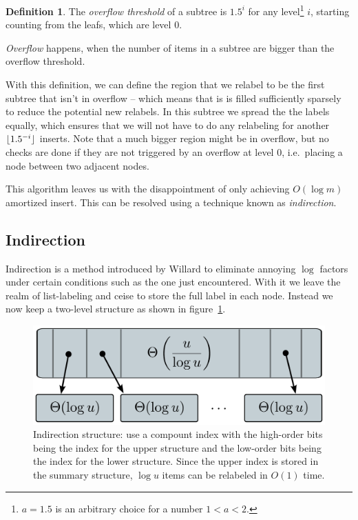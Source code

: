 \documentclass[11pt,a4paper,twoside,openright]{Thesis}
\DeclarePairedDelimiter\floor{\lfloor}{\rfloor}
\theoremstyle{definition}
\newtheorem*{defn}{Definition}
\newcommand{\Figref}[1]{figure~\ref{fig:#1}}
\newcommand{\figlabel}[1]{\label{fig:#1}}
\begin{document}
\begin{defn}
  The \emph{overflow threshold} of a subtree is $1.5^i$ for any 
  level\footnote{$a=1.5$ is an arbitrary choice for a number $1 < a < 2$.} $i$, 
  starting counting from the leafs, which are level 0.

  \emph{Overflow} happens, when the number of items in a subtree are bigger 
  than the overflow threshold.
\end{defn}

With this definition, we can define the region that we relabel to be the 
first subtree that isn't in overflow -- which means that is is filled 
sufficiently sparsely to reduce the potential new relabels. In this subtree 
we spread the the labels equally, which ensures that we will not have to 
do any relabeling for another $\floor{1.5^{-i}}$ inserts. Note that a much 
bigger region might be in overflow, but no checks are done if they are not 
triggered by an overflow at level 0, i.e.\ placing a node between two adjacent
nodes.

This algorithm leaves us with the disappointment of only achieving $O(\log m)$ 
amortized insert. This can be resolved using a technique known as 
\emph{indirection}.

\subsection{Indirection}
Indirection is a method introduced by Willard\cite{Will82a} to eliminate
annoying $\log$ factors under certain conditions such as the one just
encountered.  With it we leave the realm of list-labeling and ceise to store
the full label in each node. Instead we now keep a two-level structure 
as shown in \Figref{graphs/indirection}.

\begin{figure}[htpb]
  \centering
  \includegraphics[width=0.8\linewidth]{graphs/indirection}
  \caption{Indirection structure: use a compount index with the high-order 
  bits being the index for the upper structure and the low-order bits being 
the index for the lower structure. Since the upper index is stored in the 
summary structure, $\log u$ items can be relabeled in $O(1)$ time.}
  \figlabel{graphs/indirection}
\end{figure}
\end{document}
